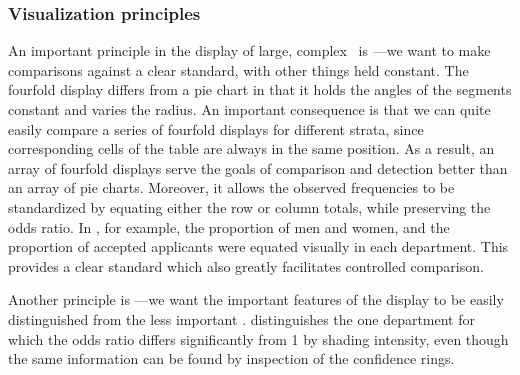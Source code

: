 \subsubsection{Visualization principles}
An important principle in the display of large, complex \Dsets\
is ---we want to make comparisons
against a clear standard, with
other things held constant.
The fourfold display
differs from a pie chart in that it holds the
angles of the segments constant and varies the radius.
An important consequence is that we can quite easily compare a
series of fourfold displays for different strata, since corresponding
cells of the table are always in the same position.
As a result, an array of fourfold displays serve the goals of comparison and
detection better than an array of pie charts.
Moreover, it allows the observed frequencies to be standardized
by equating either the row or column totals, while preserving
the odds ratio.
In , for example,
the proportion of men and women, and the proportion
of accepted applicants were equated visually in each department.
This provides a clear standard which
also greatly facilitates controlled comparison.

Another principle is ---we want the important
features
of the display to be easily distinguished from the less important
\citep{Tukey:93}.
 distinguishes the one department for which
the odds ratio differs significantly from 1 by shading intensity,
even though the same information can be found by inspection of the
confidence rings.

